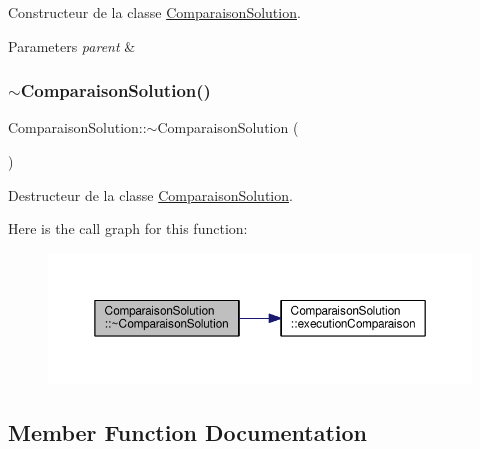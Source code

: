 Constructeur de la classe \hyperlink{classComparaisonSolution}{Comparaison\+Solution}. 


\begin{DoxyParams}{Parameters}
{\em parent} & \\
\hline
\end{DoxyParams}
\mbox{\label{classComparaisonSolution_a07a910b473173981273789934cf34e7f}} 
\subsubsection{\texorpdfstring{$\sim$\+Comparaison\+Solution()}{~ComparaisonSolution()}}
{\footnotesize\ttfamily Comparaison\+Solution\+::$\sim$\+Comparaison\+Solution (\begin{DoxyParamCaption}{ }\end{DoxyParamCaption})}



Destructeur de la classe \hyperlink{classComparaisonSolution}{Comparaison\+Solution}. 

Here is the call graph for this function\+:\nopagebreak
\begin{figure}[H]
\begin{center}
\leavevmode
\includegraphics[width=350pt]{classComparaisonSolution_a07a910b473173981273789934cf34e7f_cgraph}
\end{center}
\end{figure}


\subsection{Member Function Documentation}
\mbox{\label{classComparaisonSolution_a973538f344027840ecf5a7f6b254de69}} 
